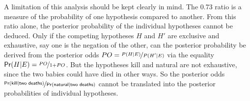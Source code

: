 \documentclass{article}
\newcommand{\pr}{\mathsf{Pr}}
\begin{document}

A limitation of this analysis should be kept clearly in mind. The 0.73 ratio is a measure of the probability of one hypothesis compared to another.
From this ratio alone, the posterior probability of the individual hypotheses %
cannot be deduced.  %
Only if the competing hypotheses $H$ and $H'$ are exclusive and exhaustive, say one is the negation of the other, can the posterior probability be derived from the posterior odds $PO=\nicefrac{P(H \vert E)}{ P(H' \vert E)}$ via the equality $\pr(H\vert E)= \nicefrac{PO}{1+PO}$. 
But the hypotheses \textsf{kill} and \textsf{natural} are not exhaustive, since the two babies could have died in other ways. So the posterior odds
$ \nicefrac{\pr(\textsf{kill} \vert \textsf{two deaths})}{\pr(\textsf{natural} \vert \textsf{two deaths})}$ cannot be translated into the posterior probabilities of individual hypotheses. 






\end{document}
